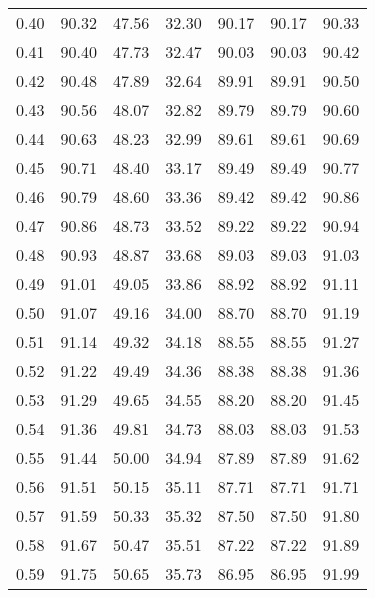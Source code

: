 \begin{tabular}{|c|c|c|c|c|c|c|}
      0.40 &     90.32 &     47.56 &      32.30 &   90.17 &      90.17 &         90.33 \\
      0.41 &     90.40 &     47.73 &      32.47 &   90.03 &      90.03 &         90.42 \\
      0.42 &     90.48 &     47.89 &      32.64 &   89.91 &      89.91 &         90.50 \\
      0.43 &     90.56 &     48.07 &      32.82 &   89.79 &      89.79 &         90.60 \\
      0.44 &     90.63 &     48.23 &      32.99 &   89.61 &      89.61 &         90.69 \\
      0.45 &     90.71 &     48.40 &      33.17 &   89.49 &      89.49 &         90.77 \\
      0.46 &     90.79 &     48.60 &      33.36 &   89.42 &      89.42 &         90.86 \\
      0.47 &     90.86 &     48.73 &      33.52 &   89.22 &      89.22 &         90.94 \\
      0.48 &     90.93 &     48.87 &      33.68 &   89.03 &      89.03 &         91.03 \\
      0.49 &     91.01 &     49.05 &      33.86 &   88.92 &      88.92 &         91.11 \\
      0.50 &     91.07 &     49.16 &      34.00 &   88.70 &      88.70 &         91.19 \\
      0.51 &     91.14 &     49.32 &      34.18 &   88.55 &      88.55 &         91.27 \\
      0.52 &     91.22 &     49.49 &      34.36 &   88.38 &      88.38 &         91.36 \\
      0.53 &     91.29 &     49.65 &      34.55 &   88.20 &      88.20 &         91.45 \\
      0.54 &     91.36 &     49.81 &      34.73 &   88.03 &      88.03 &         91.53 \\
      0.55 &     91.44 &     50.00 &      34.94 &   87.89 &      87.89 &         91.62 \\
      0.56 &     91.51 &     50.15 &      35.11 &   87.71 &      87.71 &         91.71 \\
      0.57 &     91.59 &     50.33 &      35.32 &   87.50 &      87.50 &         91.80 \\
      0.58 &     91.67 &     50.47 &      35.51 &   87.22 &      87.22 &         91.89 \\
      0.59 &     91.75 &     50.65 &      35.73 &   86.95 &      86.95 &         91.99 \\

\end{tabular}
